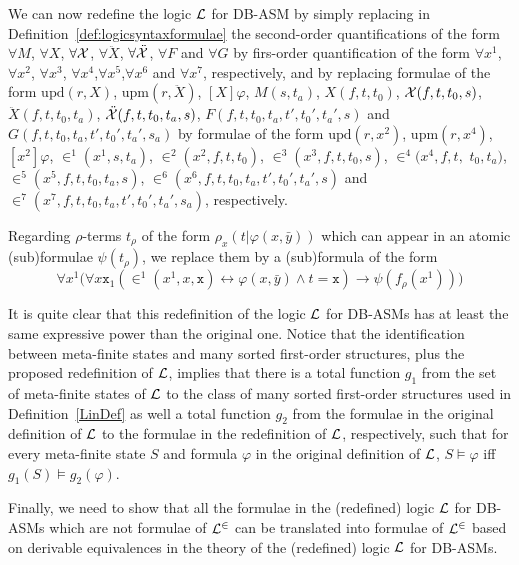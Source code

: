 \documentclass[preprint,11pt]{elsarticle}
\theoremstyle{definition}
\theoremstyle{remark}
\begin{document}
We can now redefine the logic ${\cal L}$ for DB-ASM by simply replacing in Definition~\ref{def:logicsyntaxformulae} the second-order quantifications of the form $\forall M$, $\forall X$, $\forall {\cal X}$, $\forall \ddot{X}$, $\forall \ddot{{\cal X}}$, $\forall F$ and $\forall G$ by firs-order quantification of the form $\forall x^1$, $\forall x^2$, $\forall x^3$, $\forall x^4$,$\forall x^5$,$\forall x^6$ and $\forall x^7$, respectively, and by replacing formulae of the form $\mathrm{upd}(r, X)$, $\mathrm{upm}(r, \ddot{X})$, $[X]\varphi$, $M(s,t_a)$, $X(f,t,t_0)$, ${\cal X}(f,t,t_0,s)$, $\ddot{X}(f,t,t_0,t_a)$, $\ddot{{\cal X}}(f,t,t_0,t_a,s)$, $F(f,t,t_0,t_a, t',t_0',t_a',s)$ and $G(f,t,t_0,t_a, t',t_0',t_a',s_a)$ by formulae of the form $\mathrm{upd}(r, x^2)$, $\mathrm{upm}(r, x^4)$, $[x^2]\varphi$, $\in^1\!\!(x^1\!,s,t_a)$, $\in^2\!\!(x^2\!,f,t,t_0)$, $\in^3\!\!(x^3\!,f,t,t_0,s)$, $\in^4\!\!(x^4\!,f,t,$ $t_0,t_a)$, $\in^5\!\!(x^5\!,f,t,t_0,t_a,s)$, $\in^6\!\!(x^6\!, f,t,t_0,t_a, t',t_0',t_a',s )$ and $\in^7\!\!(x^7\!,f,t,t_0,t_a, t',t_0', t_a',s_a )$, respectively.

Regarding $\rho$-terms $t_\rho$ of the form $\rho_{x}(t|\varphi(x,\bar{y}))$ which can appear in an atomic (sub)formulae $\psi(t_\rho)$, we replace them by a (sub)formula of the form
\[\forall x^1 \big( \forall x \texttt{x}_1 (\in^1\!\!(x^1,x,\texttt{x}) \leftrightarrow \varphi(x, \bar{y}) \wedge t = \texttt{x}) \rightarrow \psi(f_\rho(x^1)) \big)\]

It is quite clear that this redefinition of the logic ${\cal L}$ for DB-ASMs has at least the same expressive power than the original one. Notice that the identification between meta-finite states and many sorted first-order structures, plus the proposed redefinition of ${\cal L}$, implies that there is a total function $g_1$ from the set of meta-finite states of ${\cal L}$ to the class of many sorted first-order structures used in Definition~\ref{LinDef} as well a total function $g_2$ from the formulae in the original definition of ${\cal L}$ to the formulae in the redefinition of ${\cal L}$,  respectively, such that for every meta-finite state $S$ and formula $\varphi$ in the original definition of ${\cal L}$, $S \models \varphi$ iff $g_1(S) \models g_2(\varphi)$.

Finally, we need to show that all the formulae in the (redefined) logic ${\cal L}$ for DB-ASMs which are not formulae of ${\cal L}^\in$ can be translated into formulae of ${\cal L}^\in$ based on derivable equivalences in the theory of the (redefined) logic ${\cal L}$ for DB-ASMs.
\end{document}
